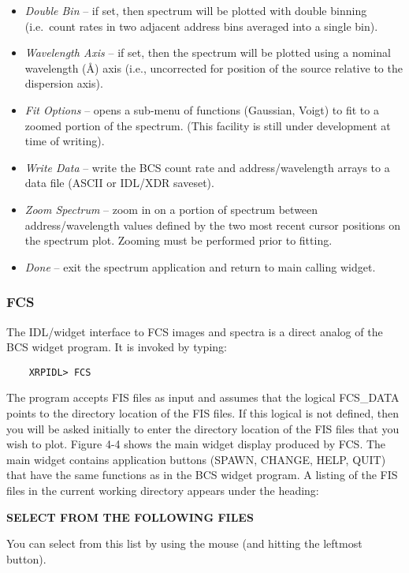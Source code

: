 {{{\begin{itemize}
\item{\it Double Bin} -- if set, then spectrum will be plotted
with double binning
(i.e.\ count rates in two adjacent address bins averaged into a single bin).

\item{\it Wavelength Axis} -- if set, then the spectrum
will be plotted using a nominal wavelength (\AA) axis
(i.e., uncorrected for position of the source relative to the dispersion axis).

\item{\it Fit Options} -- opens a sub-menu of functions (Gaussian,
Voigt) to fit to a zoomed portion of the spectrum. (This facility
is still under development at time of writing).

\item{\it Write Data} -- write the BCS count rate and address/wavelength
arrays
to a data file (ASCII or IDL/XDR saveset).

\item{\it Zoom Spectrum} -- zoom in on a portion of spectrum
between address/wavelength values defined by the two most recent cursor
positions on the spectrum plot. Zooming must be performed prior to fitting.

\item{\it Done} -- exit the spectrum application and return to main calling widget.
\end{itemize}

\subsubsection{FCS}

The IDL/widget interface to FCS images and spectra is a direct analog
of the BCS widget program.
It is invoked by typing:
\begin{verbatim}
    XRPIDL> FCS
\end{verbatim}
The program accepts FIS files as input and assumes that the logical
FCS\_DATA points to the directory  location of the FIS files. If this logical
is not defined, then you will be asked initially to  enter the directory
location of the FIS files that you wish to plot. Figure 4-4
shows the main widget display produced by FCS.  The main widget
contains application buttons (SPAWN, CHANGE, HELP, QUIT) that have the same
functions as in the BCS widget program. A listing of the FIS files in the
current working directory appears under the heading:
\newline
\newline
\centerline{\bf SELECT FROM THE FOLLOWING FILES}
\newline
\newline
You can select from this list by using the mouse (and hitting the leftmost button).

}}}
